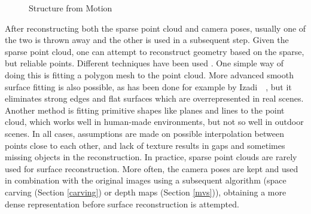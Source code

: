 \begin{figure}[htb!]
 \centering
 \caption{Structure from Motion}
 \label{fig:sfm}
\end{figure}

After reconstructing both the sparse point cloud and camera poses, usually one of the two is thrown away and the other is used in a subsequent step. Given the sparse point cloud, one can attempt to reconstruct geometry based on the sparse, but reliable points. Different techniques have been used \cite{Seitz2006}. One simple way of doing this is fitting a polygon mesh to the point cloud. More advanced smooth surface fitting is also possible, as has been done for example by Izadi~\etal~\cite{Izadi2011}, but it eliminates strong edges and flat surfaces which are overrepresented in real scenes. Another method is fitting primitive shapes like planes and lines to the point cloud, which works well in human-made environments, but not so well in outdoor scenes. In all cases, assumptions are made on possible interpolation between points close to each other, and lack of texture results in gaps and sometimes missing objects in the reconstruction. In practice, sparse point clouds are rarely used for surface reconstruction. More often, the camera poses are kept and used in combination with the original images using a subsequent algorithm (\eg space carving (Section \ref{carving}) or depth maps (Section \ref{mvs})), obtaining a more dense representation before surface reconstruction is attempted.


